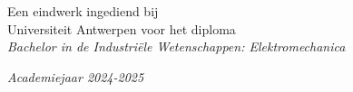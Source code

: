 \documentclass[a4paper,11pt,oneside]{book}
\begin{document}
\begin{titlepage}
\begin{center}
            \large Een eindwerk ingediend bij\\Universiteit Antwerpen voor het diploma\\
            \textit{Bachelor in de Industriële Wetenschappen: Elektromechanica}\\[0.3cm]
            \vfill
            
            \textit{Academiejaar 2024-2025 \\[0.3cm]}
        \end{center}
    \end{titlepage}
    
    
     
    
       
    
    \tableofcontents
    \listoffigures
    \listoftables



    
    
    \mainmatter
    
\end{document}
